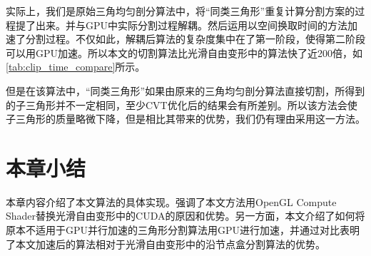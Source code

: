     实际上，我们是原始三角均匀剖分算法中，将“同类三角形”重复计算分割方案的过程提了出来。并与GPU中实际分割过程解耦。然后运用以空间换取时间的方法加速了分割过程。不仅如此，解耦后算法的复杂度集中在了第一阶段，使得第二阶段可以用GPU加速。所以本文的切割算法比光滑自由变形中的算法快了近200倍，如\autoref{tab:clip_time_compare}所示。

    但是在该算法中，“同类三角形”如果由原来的三角均匀剖分算法直接切割，所得到的子三角形并不一定相同，至少CVT优化后的结果会有所差别。所以该方法会使子三角形的质量略微下降，但是相比其带来的优势，我们仍有理由采用这一方法。

\section{本章小结}
    本章内容介绍了本文算法的具体实现。强调了本文方法用OpenGL Compute Shader替换光滑自由变形中的CUDA的原因和优势。另一方面，本文介绍了如何将原本不适用于GPU并行加速的三角形分割算法用GPU进行加速，并通过对比表明了本文加速后的算法相对于光滑自由变形中的沿节点盒分割算法的优势。
